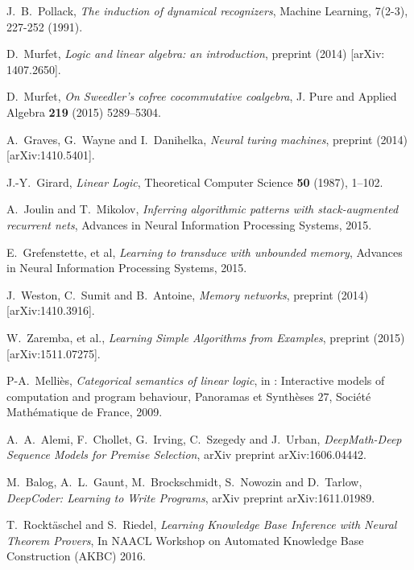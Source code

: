 \documentclass[english,letter paper,12pt,leqno]{article}
\theoremstyle{example}
\numberwithin{equation}{section}
\begin{document}
\begin{thebibliography}{BHLS03}
J.~B.~Pollack, \textsl{The induction of dynamical recognizers}, Machine Learning, 7(2-3), 227-252 (1991). 

D.~Murfet, \textsl{Logic and linear algebra: an introduction}, preprint (2014) [arXiv: 1407.2650].

D.~Murfet, \textsl{On Sweedler's cofree cocommutative coalgebra}, J. Pure and Applied Algebra \textbf{219} (2015) 5289--5304.

A.~Graves, G.~Wayne and I.~Danihelka, \textsl{Neural turing machines}, preprint (2014) [arXiv:1410.5401].

J.-Y.~Girard, \textsl{Linear Logic}, Theoretical Computer Science \textbf{50} (1987), 1--102.

A.~Joulin and T.~Mikolov, \textsl{Inferring algorithmic patterns with stack-augmented recurrent nets}, Advances in Neural Information Processing Systems, 2015.

E.~Grefenstette, et al, \textsl{Learning to transduce with unbounded memory}, Advances in Neural Information Processing Systems, 2015.

J.~Weston, C.~Sumit and B.~Antoine, \textsl{Memory networks}, preprint (2014) [arXiv:1410.3916].

W.~Zaremba, et al., \textsl{Learning Simple Algorithms from Examples}, preprint (2015) [arXiv:1511.07275].

P-A.~Melli\`{e}s, \textsl{Categorical semantics of linear logic}, in : Interactive models of computation and program behaviour, Panoramas et Synth\`{e}ses $27$, Soci\'{e}t\'{e} Math\'{e}matique de France, 2009.

A.~A.~Alemi, F.~Chollet, G.~Irving, C.~Szegedy and J.~Urban, \textsl{DeepMath-Deep Sequence Models for Premise Selection}, arXiv preprint arXiv:1606.04442.

M.~Balog, A.~L.~Gaunt, M.~Brockschmidt, S.~Nowozin and D.~Tarlow, \textsl{DeepCoder: Learning to Write Programs}, arXiv preprint arXiv:1611.01989.

T.~Rockt\"aschel and S.~Riedel, \textsl{Learning Knowledge Base Inference with Neural Theorem Provers}, In NAACL Workshop on Automated Knowledge Base Construction (AKBC) 2016.

\end{thebibliography}
\end{document}

